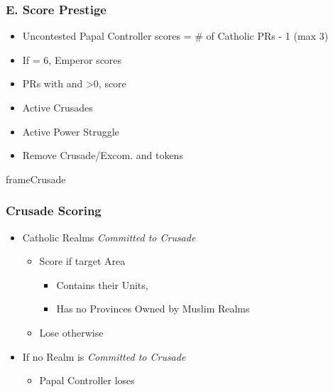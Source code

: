 \documentclass[10pt]{article}
\newlength{\fhCrusade} \setlength\fhCrusade{9\baselineskip}
\begin{document}
\subsubsection*{E. Score Prestige}
\begin{itemize}
	\item Uncontested Papal Controller scores \prestige = \# of Catholic PRs - 1 (max 3)
	\item If \authority = 6, Emperor scores 
	\item PRs with  and \stability>0, score 
	\item Active Crusades
	\item Active Power Struggle
	\item Remove Crusade/Excom. and \battlegroundarea tokens
\end{itemize}
\begin{dynamiccontents*}{frameCrusade}\begin{eubox}{\fhCrusade}
	\subsubsection*{Crusade Scoring }
	\begin{itemize}
		\item Catholic Realms \emph{Committed to Crusade}
		\begin{itemize}
			\item Score  if target Area
			\begin{itemize}
				\item Contains their Units, 
				\item Has no Provinces Owned by Muslim Realms
			\end{itemize}
			\item Lose  otherwise
		\end{itemize}
		\item If no Realm is \emph{Committed to Crusade}
		\begin{itemize}
			\item Papal Controller loses 
		\end{itemize}
	\end{itemize}
\end{eubox}\end{dynamiccontents*}
\end{document}
